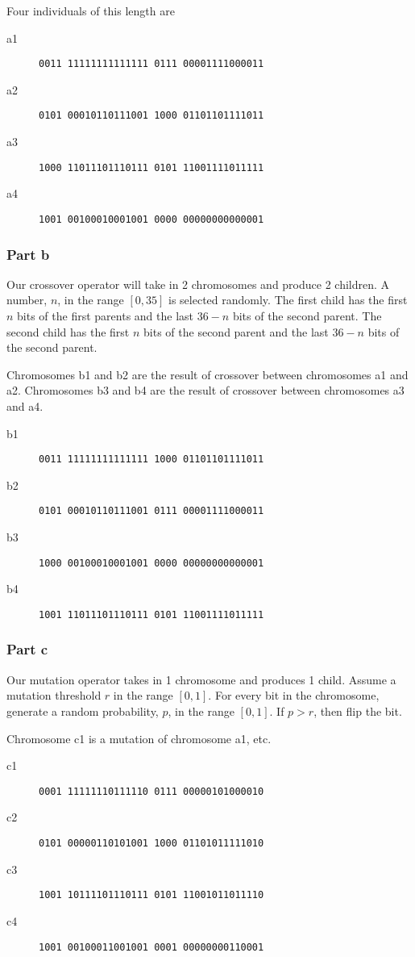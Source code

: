 \documentclass[a4paper]{article}
\begin{document}
Four individuals of this length are
\begin{description}
\item[a1] \texttt{0011 11111111111111 0111 00001111000011}
\item[a2] \texttt{0101 00010110111001 1000 01101101111011}
\item[a3] \texttt{1000 11011101110111 0101 11001111011111}
\item[a4] \texttt{1001 00100010001001 0000 00000000000001}
\end{description}

\subsubsection{Part b}
Our crossover operator will take in 2 chromosomes and produce 2 children. A number, $n$,  in the range $[0, 35]$ is selected randomly. The first child has the first $n$ bits of the first parents and the last $36-n$ bits of the second parent. The second child has the first $n$ bits of the second parent and the last $36-n$ bits of the second parent.

Chromosomes b1 and b2 are the result of crossover between chromosomes a1 and a2. Chromosomes b3 and b4 are the result of crossover between chromosomes a3 and a4.

\begin{description}
\item[b1] \texttt{0011 11111111111111 1000 01101101111011}
\item[b2] \texttt{0101 00010110111001 0111 00001111000011}
\item[b3] \texttt{1000 00100010001001 0000 00000000000001}
\item[b4] \texttt{1001 11011101110111 0101 11001111011111}
\end{description}

\subsubsection{Part c}
Our mutation operator takes in 1 chromosome and produces 1 child. Assume a mutation threshold $r$ in the range $[0,1]$. For every bit in the chromosome, generate a random probability, $p$, in the range $[0,1]$. If $p > r$, then flip the bit.

Chromosome c1 is a mutation of chromosome a1, etc.

\begin{description}
\item[c1] \texttt{0001 11111110111110 0111 00000101000010}
\item[c2] \texttt{0101 00000110101001 1000 01101011111010}
\item[c3] \texttt{1001 10111101110111 0101 11001011011110}
\item[c4] \texttt{1001 00100011001001 0001 00000000110001}
\end{description}
\end{document}
